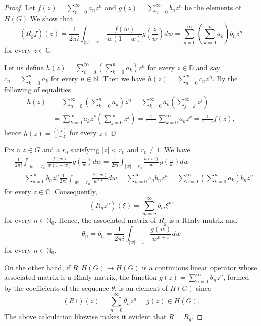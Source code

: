 \documentclass[10pt,a4paper]{amsart}
\begin{document}
\begin{proof} Let $\displaystyle f(z)=\sum^{\infty}_{n=0} a_{n}z^{n}$ and $\displaystyle g(z)=\sum^{\infty}_{n=0}b_{n}z^{n}$ be the elements of $H(G)$ We show that
$$(R_{g}f)(z)=\frac{1}{2\pi i}\int_{|w|=r_{0}} \frac{f(w)}{w(1-w)}g\left(\frac{z}{w}\right)dw=\sum^{\infty}_{n=0}\left(\sum^{n}_{k=0}a_{k}\right)b_{n}z^{n}$$
for every $z\in \mathbb{C}$. 

Let us define
$\displaystyle h(z)=\sum^{\infty}_{n=0}\left(\sum^{n}_{k=0}a_{k}\right)z^{n}$ for every $z\in \mathbb{D}$ and say $\displaystyle c_{n}=\sum^{n}_{k=0}a_{k}$ for every $n\in \mathbb{N}$. Then we have $\displaystyle h(z)=\sum^{\infty}_{n=0}c_n z^n$. By the following of equalities
\begin{equation*}
\begin{split}
h(z)&= \sum^{\infty}_{n=0} \left(\sum^{n}_{k=0}a_{k}\right)z^{n}=\sum^{\infty}_{k=0}a_{k}\left(\sum^{\infty}_{j=k} z^{j}\right) \\
&=\sum^{\infty}_{k=0} a_{k}z^{k}\left(\sum^{\infty}_{j=0}z^{j}\right)=\frac{1}{1-z}\sum^{\infty}_{k=0}a_{k}z^{k}=\frac{1}{1-z}f(z),
\end{split}
\end{equation*}
hence $\displaystyle h(z)=\frac{f(z)}{1-z}$ for every $z\in \mathbb{D}$. 

Fix a $z\in G$ and a 
$r_{0}$ satisfying $|z|<r_{0}$ and $r_{0}\neq 1$.  We have
\begin{equation*}
\begin{split}
&\frac{1}{2\pi i}\int_{|w|=r_{0}} \frac{f(w)}{w(1-w)}g\left(\frac{z}{w}\right)dw=\frac{1}{2\pi i}\int_{|w|=r_{0}} \frac{h(w)}{w}g\left(\frac{z}{w}\right)dw \\
&= \sum^{\infty}_{n=0}b_{n}z^{n} \frac{1}{2\pi i}\int_{|w|=r_{0}} \frac{h(w)}{w^{n+1}}dw=\sum^{\infty}_{n=0}c_nb_nz^n=\sum^{\infty}_{n=0}\left(\sum^{n}_{k=0}a_{k}\right)b_{n}z^n
\end{split}
\end{equation*}
for every $z\in \mathbb{C}$. Consequently,
$$(R_{g}z^{n})(\xi)=\sum^{\infty}_{m=n}b_{m}\xi^{m}$$
for every $n\in \mathbb{N}_{0}$. Hence, the associated matrix of $R_{g}$ is a Rhaly matrix and 
$$\theta_{n}=b_{n}=\frac{1}{2\pi i} \int_{|w|=1} \frac{g(w)}{w^{n+1}}dw$$
for every $n\in \mathbb{N}_{0}$.

On the other hand, if $R:H(G)\to H(G)$ is a continuous linear operator whose associated matrix is a Rhaly matrix, the function $\displaystyle g(z)=\sum^{\infty}_{n=0}\theta_n z^n$, formed by the coefficients of the sequence $\theta$, is an element of $H(G)$ since
\begin{equation*}
(R1)(z)=\sum^{\infty}_{n=0}\theta_{n}z^{n}=g(z)\in H(G). 
\end{equation*}
The above calculation likewise makes it evident that $R=R_{g}$.
\end{proof}
\end{document}
